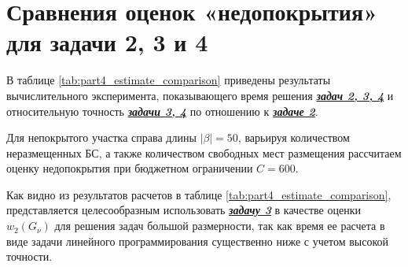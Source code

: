 

\section{Сравнения оценок «недопокрытия» для задачи 2, 3 и 4}\label{part4:task_234}

В таблице \cref{tab:part4_estimate_comparison} приведены результаты вычислительного эксперимента, показывающего время решения \underline{\textit{\textbf{задач 2, 3, 4}}} и относительную точность \underline{\textit{\textbf{задачи 3, 4}}} по отношению к \underline{\textit{\textbf{задаче 2}}}.

Для непокрытого участка справа длины $|\beta| = 50$, варьируя количеством неразмещенных БС, а также количеством свободных мест размещения рассчитаем оценку недопокрытия при бюджетном ограничении $C=600$.


Как видно из результатов расчетов в таблице \cref{tab:part4_estimate_comparison}, представляется целесообразным  использовать  \underline{\textit{\textbf{задачу 3}}} в качестве оценки $w_2 (G_\nu )$ для решения задач большой размерности, так как время ее расчета в виде задачи линейного программирования существенно ниже с учетом высокой точности.


